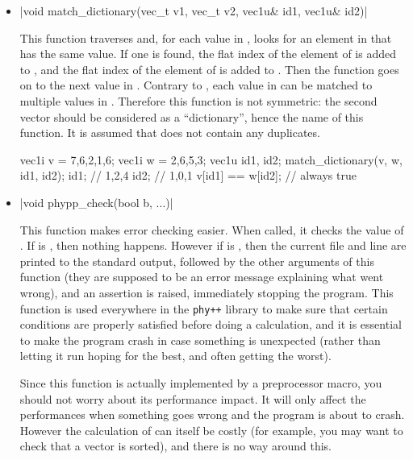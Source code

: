 \documentclass[12pt]{report}
\newcommand{\phypp}{\texttt{phy++}\xspace}
\newenvironment{example}
{
    \begin{mdframed}[style=example,frametitle={Example}]
}
{
    \end{mdframed}
}
\begin{document}
\begin{itemize}
\item \cppinline|void match_dictionary(vec_t v1, vec_t v2, vec1u& id1, vec1u& id2)| 

This function traverses  and, for each value in , looks for an element in  that has the same value. If one is found, the flat index of the element of  is added to , and the flat index of the element of  is added to . Then the function goes on to the next value in . Contrary to , each value in  can be matched to multiple values in . Therefore this function is not symmetric: the second vector should be considered as a ``dictionary'', hence the name of this function. It is assumed that  does not contain any duplicates.

\begin{example}
\begin{cppcode}
vec1i v = {7,6,2,1,6};
vec1i w = {2,6,5,3};
vec1u id1, id2;
match_dictionary(v, w, id1, id2);
id1; // {1,2,4}
id2; // {1,0,1}
v[id1] == w[id2]; // always true
\end{cppcode}
\end{example}

\item \cppinline|void phypp_check(bool b, ...)| 

This function makes error checking easier. When called, it checks the value of . If  is , then nothing happens. However if  is , then the current file and line are printed to the standard output, followed by the other arguments of this function (they are supposed to be an error message explaining what went wrong), and an assertion is raised, immediately stopping the program. This function is used everywhere in the \phypp library to make sure that certain conditions are properly satisfied before doing a calculation, and it is essential to make the program crash in case something is unexpected (rather than letting it run hoping for the best, and often getting the worst).

Since this function is actually implemented by a preprocessor macro, you should not worry about its performance impact. It will only affect the performances when something goes wrong and the program is about to crash. However the calculation of  can itself be costly (for example, you may want to check that a vector is sorted), and there is no way around this.


\end{itemize}
\end{document}
